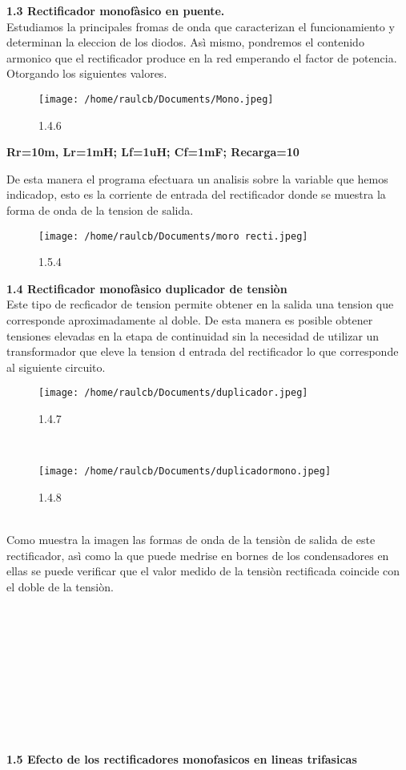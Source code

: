\documentclass[11pt]{article}
\begin{document}
\maketitle \textbf{1.3 Rectificador monofàsico en puente.}
\\
Estudiamos la principales fromas de onda que caracterizan el funcionamiento y determinan la eleccion de los diodos. Asì mismo, pondremos el contenido armonico que el rectificador produce en la red emperando el factor de potencia.
Otorgando los siguientes valores.
\begin{figure}[htp]
\centering
\texttt{[image: /home/raulcb/Documents/Mono.jpeg]}
\caption{1.4.6}
\label{.}
\end{figure}
\textbf{Rr=10m, Lr=1mH; Lf=1uH; Cf=1mF; Recarga=10}


De esta manera el programa efectuara un analisis sobre la variable que hemos indicadop, esto es la corriente de entrada del rectificador donde se muestra la forma de onda de la tension de salida.
\begin{figure}[htp]
\centering
\texttt{[image: /home/raulcb/Documents/moro recti.jpeg]}
\caption{1.5.4}
\label{.}
\end{figure}

\textbf{1.4 Rectificador monofàsico duplicador de tensiòn}
\\
Este tipo de recficador de tension permite obtener en la salida una tension que corresponde aproximadamente al doble. De esta manera es posible obtener tensiones elevadas en la etapa de continuidad sin la necesidad de utilizar un transformador que eleve la tension d entrada del rectificador lo que corresponde al siguiente circuito.
\begin{figure}[htp]
\centering
\texttt{[image: /home/raulcb/Documents/duplicador.jpeg]}
\caption{1.4.7}
\label{.}
\end{figure}
\\
\begin{figure}[htp]
\centering
\texttt{[image: /home/raulcb/Documents/duplicadormono.jpeg]}
\caption{1.4.8}
\label{.}
\end{figure}
\\
Como muestra la imagen las formas de onda de la tensiòn de salida de este rectificador, asì como la que puede medrise en bornes de los condensadores en ellas se puede verificar que el valor medido de la tensiòn rectificada coincide con el doble de la tensiòn.
\\
\\
\\
\\
\\
\\
\\
\\
\\
\\\\
\textbf{1.5 Efecto de los rectificadores monofasicos en lineas trifasicas}
\\
\end{document}
